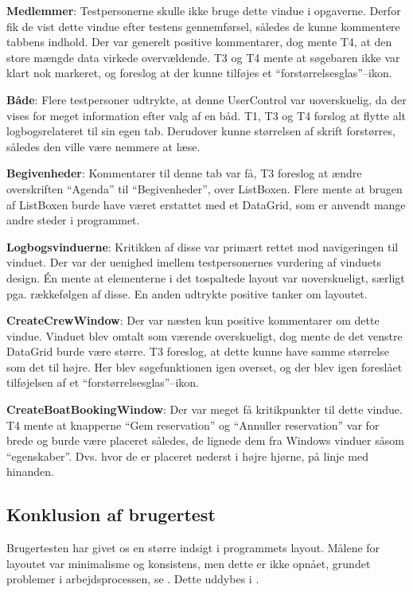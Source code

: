 \textbf{Medlemmer}:
Testpersonerne skulle ikke bruge dette vindue i opgaverne.
Derfor fik de vist dette vindue efter testens gennemførsel, således de kunne kommentere tabbens indhold. 
Der var generelt positive kommentarer, dog mente T4, at den store mængde data virkede overvældende. 
T3 og T4 mente at søgebaren ikke var klart nok markeret, og foreslog at der kunne tilføjes et ``forstørrelsesglas''--ikon.

\textbf{Både}:
Flere testpersoner udtrykte, at denne UserControl var uoverskuelig, da der vises for meget information efter valg af en båd.
T1, T3 og T4 forslog at flytte alt logbogsrelateret til sin egen tab.
Derudover kunne størrelsen af skrift forstørres, således den ville være nemmere at læse. 

\textbf{Begivenheder}:
Kommentarer til denne tab var få, T3 foreslog at ændre overskriften ``Agenda'' til ``Begivenheder'', over ListBoxen.
Flere mente at brugen af ListBoxen burde have været erstattet med et DataGrid, som er anvendt mange andre steder i programmet. 

\textbf{Logbogsvinduerne}:
Kritikken af disse var primært rettet mod navigeringen til vinduet. 
Der var der uenighed imellem testpersonernes vurdering af vinduets design.
Én mente at elementerne i det tospaltede layout var uoverskueligt, særligt pga. rækkefølgen af disse. 
En anden udtrykte positive tanker om layoutet.

\textbf{CreateCrewWindow}:
Der var næsten kun positive kommentarer om dette vindue.
Vinduet blev omtalt som værende overskueligt, dog mente de det venstre DataGrid burde være større.
T3 foreslog, at dette kunne have samme størrelse som det til højre. 
Her blev søgefunktionen igen overset, og der blev igen foreslået tilføjelsen af et ``forstørrelsesglas''--ikon.

\textbf{CreateBoatBookingWindow}:
Der var meget få kritikpunkter til dette vindue.
T4 mente at knapperne ``Gem reservation'' og ``Annuller reservation'' var for brede og burde være placeret således, de lignede dem fra Windows vinduer såsom ``egenskaber''. 
Dvs. hvor de er placeret nederst i højre hjørne, på linje med hinanden. 

\subsection{Konklusion af brugertest}
Brugertesten har givet os en større indsigt i programmets layout.
Målene for layoutet var minimalisme og konsistens, men dette er ikke opnået, grundet problemer i arbejdsprocessen, se . Dette uddybes i .
 
